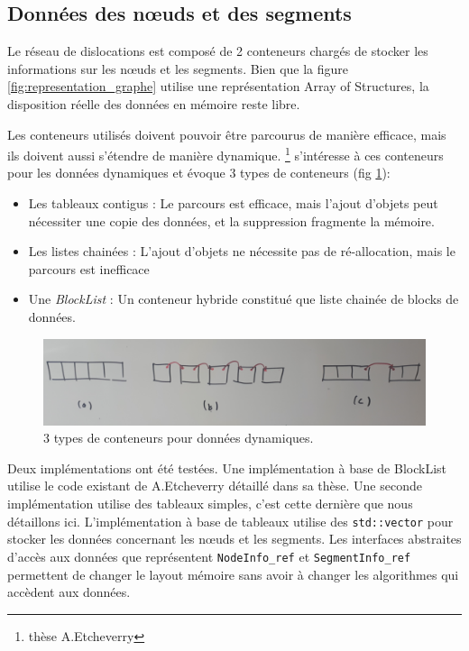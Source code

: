 \subsection{Données des nœuds et des segments}

Le réseau de dislocations est composé de 2 conteneurs chargés de stocker les informations sur les nœuds et les segments. Bien que la figure \ref{fig:representation_graphe} utilise une représentation Array of Structures, la disposition réelle des données en mémoire reste libre. 

Les conteneurs utilisés doivent pouvoir être parcourus de manière efficace, mais ils doivent aussi s'étendre de manière dynamique. \footnote{thèse A.Etcheverry} s'intéresse à ces conteneurs pour les données dynamiques et évoque 3 types de conteneurs (fig \ref{fig:conteneurs_dynamiques}):
\begin{itemize}
	\item Les tableaux contigus : Le parcours est efficace, mais l'ajout d'objets peut nécessiter une copie des données, et la suppression fragmente la mémoire.
	\item Les listes chainées : L'ajout d'objets ne nécessite pas de ré-allocation, mais le parcours est inefficace
	\item Une \textit{BlockList} : Un conteneur hybride constitué que liste chainée de blocks de données.
\end{itemize}

\begin{figure}
    \includegraphics[width=\textwidth]{img/conteneurs_dynamiques}
    \caption{3 types de conteneurs pour données dynamiques.}
    \label{fig:conteneurs_dynamiques}
\end{figure}


Deux implémentations ont été testées. Une implémentation à base de BlockList utilise le code existant de A.Etcheverry détaillé dans sa thèse. Une seconde implémentation utilise des tableaux simples, c'est cette dernière que nous détaillons ici. L'implémentation à base de tableaux utilise des \texttt{std::vector} pour stocker les données concernant les nœuds et les segments. Les interfaces abstraites d'accès aux données que représentent \verb|NodeInfo_ref| et \verb|SegmentInfo_ref| permettent de changer le layout mémoire sans avoir à changer les algorithmes qui accèdent aux données. 

